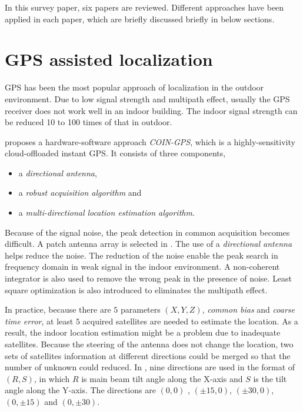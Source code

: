 \documentclass[letterpaper]{article}
\begin{document}
In this survey paper, six papers are reviewed.
Different approaches have been applied in each paper, which are briefly discussed briefly in below sections.

\section{GPS assisted localization}
\label{sec:gps_local}

GPS has been the most popular approach of localization in the outdoor environment.
Due to low signal strength and multipath effect, usually the GPS receiver does not work well in an indoor building.
The indoor signal strength can be reduced 10 to 100 times of that in outdoor.

\cite{Nirjon:2014:CIL:2594368.2594378} proposes a hardware-software approach \emph{COIN-GPS}, which is a highly-sensitivity cloud-offloaded instant GPS.
It consists of three components,
\begin{itemize}
	\item a \emph{directional antenna},
	\item a \emph{robust acquisition algorithm} and
	\item a \emph{multi-directional location estimation algorithm}.
\end{itemize}

Because of the signal noise, the peak detection in common acquisition becomes difficult.
A patch antenna array is selected in \cite{Nirjon:2014:CIL:2594368.2594378}.
The use of a \emph{directional antenna} helps reduce the noise.
The reduction of the noise enable the peak search in frequency domain in weak signal in the indoor environment.
A non-coherent integrator is also used to remove the wrong peak in the presence of noise.
Least square optimization is also introduced to eliminates the multipath effect.

In practice, because there are $ 5 $ parameters $ (X, Y, Z) $, \emph{common bias} and \emph{coarse time error}, at least $ 5 $ acquired satellites are needed to estimate the location.
As a result, the indoor location estimation might be a problem due to inadequate satellites.
Because the steering of the antenna does not change the location, two sets of satellites information at different directions could be merged so that the number of unknown could reduced.
In \cite{Nirjon:2014:CIL:2594368.2594378}, nine directions are used in the format of $ (R, S) $, in which $ R $ is main beam tilt angle along the X-axis and $ S $ is the tilt angle along the Y-axis.
The directions are $ (0, 0) $ , $ (\pm 15, 0) $, $ (\pm 30, 0) $, $ (0, \pm 15) $ and $ (0, \pm 30) $.
\end{document}
